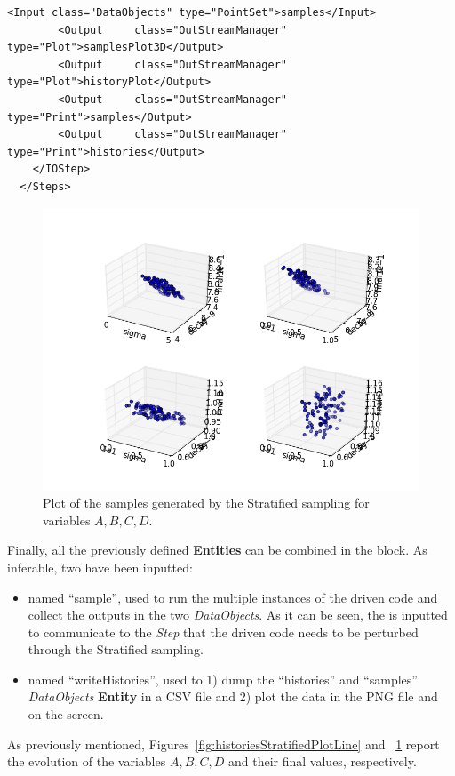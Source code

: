 \begin{enumerate}
\begin{lstlisting}[style=XML,morekeywords={arg,extension,pauseAtEnd,overwrite}]
        <Input class="DataObjects" type="PointSet">samples</Input>
        <Output 	class="OutStreamManager" type="Plot">samplesPlot3D</Output>
        <Output 	class="OutStreamManager" type="Plot">historyPlot</Output>
        <Output 	class="OutStreamManager" type="Print">samples</Output>
        <Output 	class="OutStreamManager" type="Print">histories</Output>
    </IOStep>
  </Steps>
\end{lstlisting}
 \begin{figure}[h!]
  \centering
  \includegraphics[scale=0.7]{pics/Stratified_pointsets.png}
  \caption{Plot of the samples generated by the Stratified sampling for variables $A,B,C,D$.}
  \label{fig:samplesStratifiedPlotLine}
 \end{figure}
   Finally, all the previously defined \textbf{Entities} can be combined in 
   the  block. As inferable, 
   two  have been inputted:
   \begin{itemize}
     \item {} named ``sample'', used to run the multiple  
     instances of the driven code and 
     collect the outputs in the two \textit{DataObjects}. As it can be
     seen, the  is inputted to communicate to the 
     \textit{Step} that the driven code needs to
     be perturbed through the Stratified sampling.
     \item  {} named ``writeHistories'', used to 1) dump 
     the ``histories'' and ``samples'' \textit{DataObjects} 
     \textbf{Entity} in a CSV file and 2) plot the data in the PNG file and 
     on the screen.
   \end{itemize}
\end{enumerate} 
 As previously mentioned, Figures~\ref{fig:historiesStratifiedPlotLine} and ~\ref{fig:samplesStratifiedPlotLine}  report the evolution of the 
 variables $A,B,C,D$ and their final values, respectively.

